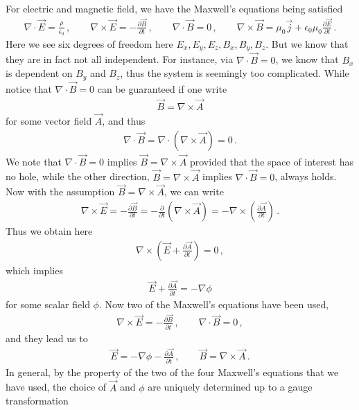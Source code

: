 \documentclass[11pt, onesided]{book}
\theoremstyle{break}
\theoremstyle{break}
\newcommand{\pd}{\partial}
\begin{document}
For electric and magnetic field, we have the Maxwell's equations being satisfied
\begin{align*}
\nabla \cdot \vec{E} = \frac{\rho}{\epsilon_0}\,,\qquad
\nabla\times\vec{E} = -\frac{\pd \vec{B}}{\pd t}\,,\qquad
\nabla \cdot \vec{B} = 0\,,\qquad 
\nabla \times \vec{B} = \mu_0\vec{j} + \epsilon_0 \mu_0 \frac{\pd \vec{E}}{\pd t}\,.
\end{align*}
Here we see six degrees of freedom here $E_x, E_y,E_z,B_x,B_y,B_z$. But we know that they are in fact not all independent. For instance, via $\nabla \cdot \vec{B}= 0$, we know that $B_x$ is dependent on $B_y$ and $B_z$, thus the system is seemingly too complicated. While notice that $\nabla \cdot \vec{B} = 0$ can be guaranteed if one write
\begin{align*}
\vec{B} = \nabla \times \vec{A}
\end{align*} 
for some vector field $\vec{A}$, and thus
\begin{align*}
\nabla \cdot \vec{B} = \nabla \cdot (\nabla \times \vec{A}) = 0\,.
\end{align*}
We note that $\nabla \cdot \vec{B} = 0$ implies $\vec{B} = \nabla \times \vec{A}$ provided that the space of interest has no hole, while the other direction, $\vec{B} = \nabla \times \vec{A}$ implies $\nabla \cdot \vec{B} = 0$, always holds. Now with the assumption $\vec{B} = \nabla \times \vec{A}$, we can write
\begin{align*}
\nabla \times \vec{E} = -\frac{\pd \vec{B}}{\pd t} = -\frac{\pd}{\pd t}\left( \nabla \times \vec{A}\right) = -\nabla \times \left( \frac{\pd\vec{A}}{\pd t}\right)\,.
\end{align*}
Thus we obtain here 
\begin{align*}
\nabla \times \left(\vec{E} + \frac{\pd \vec{A}}{\pd t}\right) = 0\,,
\end{align*}
which implies
\begin{align*}
\vec{E} + \frac{\pd \vec{A}}{\pd t} = -\nabla \phi
\end{align*}
for some scalar field $\phi$. Now two of the Maxwell's equations have been used, 
\begin{align*}
\nabla \times \vec{E} = -\frac{\pd \vec{B}}{\pd t}\,,\qquad \nabla \cdot \vec{B} = 0\,,
\end{align*}
and they lead us to
\begin{align*}
\vec{E} =-\nabla \phi - \frac{\pd \vec{A}}{\pd t} \,,\qquad
\vec{B} = \nabla \times \vec{A}\,.
\end{align*}
In general, by the property of the two of the four Maxwell's equations that we have used, the choice of $\vec{A}$ and $\phi$ are uniquely determined up to a gauge transformation
\end{document}

